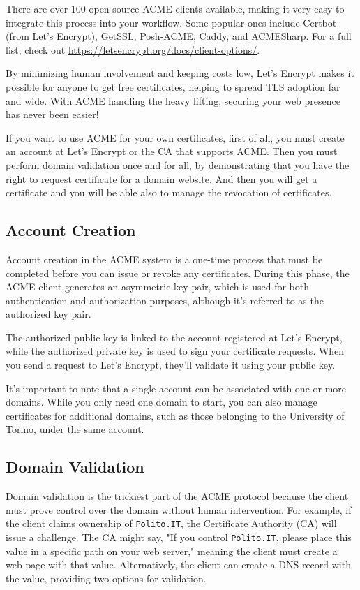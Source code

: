 There are over 100 open-source ACME clients available, making it very 
easy to integrate this process into your workflow. Some popular ones
include Certbot (from Let’s Encrypt), GetSSL, Posh-ACME, Caddy, and
ACMESharp. For a full list, check out
\url{https://letsencrypt.org/docs/client-options/}.

By minimizing human involvement and keeping costs low, Let’s Encrypt
makes it possible for anyone to get free certificates, helping to
spread TLS adoption far and wide. With ACME handling the heavy
lifting, securing your web presence has never been easier!

If you want to use ACME for your own certificates, first of all, you
must create an account at Let's Encrypt or the CA that supports ACME.
Then you must perform domain validation once and for all, by
demonstrating that you have the right to request certificate for
a domain website. And then you will get a certificate and you will be able
also to manage the revocation of certificates.

\subsection{Account Creation}

Account creation in the ACME system is a one-time process that must be
completed before you can issue or revoke any certificates. During this
phase, the ACME client generates an asymmetric key pair, which is used
for both authentication and authorization purposes, although it's
referred to as the authorized key pair.

The authorized public key is linked to the account registered at Let’s
Encrypt, while the authorized private key is used to sign your
certificate requests. When you send a request to Let’s Encrypt,
they'll validate it using your public key. 

It's important to note that a single account can be associated with
one or more domains. While you only need one domain to start, you can
also manage certificates for additional domains, such as those
belonging to the University of Torino, under the same account.

\subsection{Domain Validation}

Domain validation is the trickiest part of the ACME protocol because
the client must prove control over the domain without human
intervention. For example, if the client claims ownership of
\texttt{Polito.IT}, the Certificate Authority (CA) will issue a
challenge. The CA might say, "If you control \texttt{Polito.IT},
please place this value in a specific path on your web server,"
meaning the client must create a web page with that value.
Alternatively, the client can create a DNS record with the value,
providing two options for validation.

